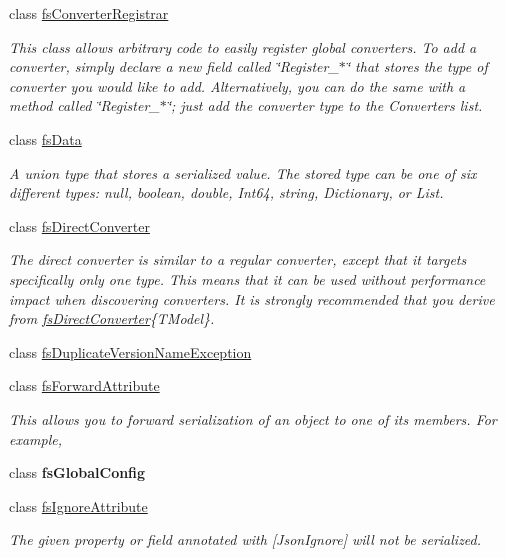 \begin{DoxyCompactItemize}
class \hyperlink{class_full_serializer_1_1fs_converter_registrar}{fs\+Converter\+Registrar}
\begin{DoxyCompactList}\small\item\em This class allows arbitrary code to easily register global converters. To add a converter, simply declare a new field called \char`\"{}\+Register\+\_\+$\ast$\char`\"{} that stores the type of converter you would like to add. Alternatively, you can do the same with a method called \char`\"{}\+Register\+\_\+$\ast$\char`\"{}; just add the converter type to the {\ttfamily Converters} list. \end{DoxyCompactList}\item 
class \hyperlink{class_full_serializer_1_1fs_data}{fs\+Data}
\begin{DoxyCompactList}\small\item\em A union type that stores a serialized value. The stored type can be one of six different types\+: null, boolean, double, Int64, string, Dictionary, or List. \end{DoxyCompactList}\item 
class \hyperlink{class_full_serializer_1_1fs_direct_converter}{fs\+Direct\+Converter}
\begin{DoxyCompactList}\small\item\em The direct converter is similar to a regular converter, except that it targets specifically only one type. This means that it can be used without performance impact when discovering converters. It is strongly recommended that you derive from \hyperlink{class_full_serializer_1_1fs_direct_converter}{fs\+Direct\+Converter}\{T\+Model\}. \end{DoxyCompactList}\item 
class \hyperlink{class_full_serializer_1_1fs_duplicate_version_name_exception}{fs\+Duplicate\+Version\+Name\+Exception}
\item 
class \hyperlink{class_full_serializer_1_1fs_forward_attribute}{fs\+Forward\+Attribute}
\begin{DoxyCompactList}\small\item\em This allows you to forward serialization of an object to one of its members. For example, \end{DoxyCompactList}\item 
class {\bfseries fs\+Global\+Config}
\item 
class \hyperlink{class_full_serializer_1_1fs_ignore_attribute}{fs\+Ignore\+Attribute}
\begin{DoxyCompactList}\small\item\em The given property or field annotated with \mbox{[}Json\+Ignore\mbox{]} will not be serialized. \end{DoxyCompactList}\item 

\end{DoxyCompactItemize}

